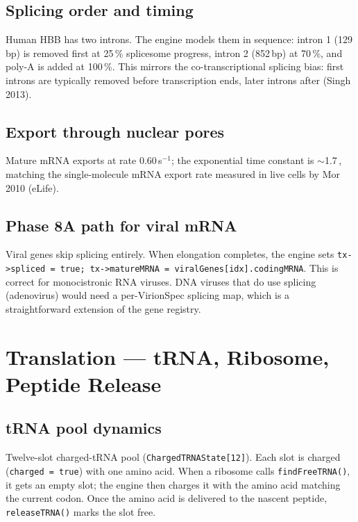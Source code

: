 \documentclass[11pt,letterpaper,twoside,openany]{book}
\newcommand{\code}[1]{\texttt{#1}}
\newcommand{\biosec}{\text{bio-s}}
\begin{document}
\section{Splicing order and timing}

Human HBB has two introns. The engine models them in sequence:
intron 1 (129\,bp) is removed first at 25\,\% splicesome progress,
intron 2 (852\,bp) at 70\,\%, and poly-A is added at 100\,\%. This
mirrors the co-transcriptional splicing bias: first introns are
typically removed before transcription ends, later introns after
(Singh 2013).

\section{Export through nuclear pores}

Mature mRNA exports at rate 0.60\,s$^{-1}$; the exponential time
constant is $\sim$1.7\,\biosec, matching the
single-molecule mRNA export rate measured in live cells by Mor
2010 (eLife).

\section{Phase 8A path for viral mRNA}

Viral genes skip splicing entirely. When elongation completes,
the engine sets \code{tx->spliced = true; tx->matureMRNA =
viralGenes[idx].codingMRNA}. This is correct for monocistronic
RNA viruses. DNA viruses that do use splicing (adenovirus) would
need a per-VirionSpec splicing map, which is a straightforward
extension of the gene registry.

\chapter{Translation --- tRNA, Ribosome, Peptide Release}
\label{ch:translation-deep}

\section{tRNA pool dynamics}

Twelve-slot charged-tRNA pool (\code{ChargedTRNAState[12]}). Each
slot is charged (\code{charged = true}) with one amino acid. When a
ribosome calls \code{findFreeTRNA()}, it gets an empty slot; the
engine then charges it with the amino acid matching the current
codon. Once the amino acid is delivered to the nascent peptide,
\code{releaseTRNA()} marks the slot free.
\end{document}
